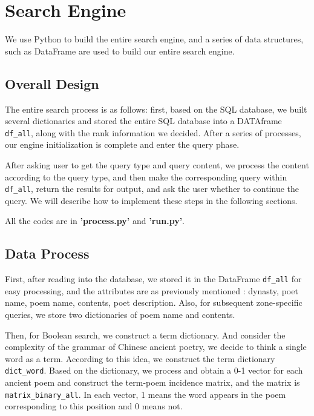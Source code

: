 \section{Search Engine} \label{sec:search}

We use Python to build the entire search engine, and a series of data structures, such as DataFrame are used to build our entire search engine.

\subsection{Overall Design}

The entire search process is as follows: first, based on the SQL database, we built several dictionaries and stored the entire SQL database into a DATAframe \lstinline{df_all}, along with the rank information we decided. After a series of processes, our engine initialization is complete and enter the query phase.

After asking user to get the query type and query content, we process the content according to the query type, and then make the corresponding query within \lstinline{df_all}, return the results for output, and ask the user whether to continue the query. We will describe how to implement these steps in the following sections.

All the codes are in\textbf{ 'process.py'} and \textbf{'run.py'}.

\subsection{Data Process}

First, after reading into the database, we stored it in the DataFrame \lstinline{df_all} for easy processing, and the attributes are as previously mentioned : dynasty, poet name, poem name, contents, poet description. Also, for subsequent zone-specific queries, we store two dictionaries of poem name and contents.

Then, for Boolean search, we construct a term dictionary. And consider the complexity of the grammar of Chinese ancient poetry, we decide to think a single word as a term. According to this idea, we construct the term dictionary \lstinline{dict_word}. Based on the dictionary, we process and obtain a 0-1 vector for each ancient poem and construct the term-poem incidence matrix, and the matrix is  \lstinline{matrix_binary_all}. In each vector, 1 means the word  appears in the poem corresponding to this position and 0 means not.

